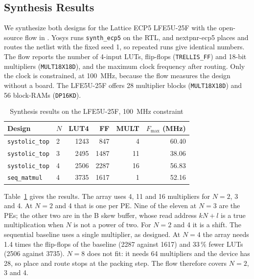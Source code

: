 
\subsection{Synthesis Results}
We synthesize both designs for the Lattice ECP5 LFE5U-25F with the open-source flow in . Yosys runs \texttt{synth\_ecp5} on the RTL, and nextpnr-ecp5 places and routes the netlist with the fixed seed 1, so repeated runs give identical numbers. The flow reports the number of 4-input LUTs, flip-flops (\texttt{TRELLIS\_FF}) and 18-bit multipliers (\texttt{MULT18X18D}), and the maximum clock frequency after routing. Only the clock is constrained, at 100~MHz, because the flow measures the design without a board. The LFE5U-25F offers 28 multiplier blocks (\texttt{MULT18X18D}) and 56 block-RAMs (\texttt{DP16KD}).

\begin{table}[t]
\centering
\caption{Synthesis results on the LFE5U-25F, 100~MHz constraint}
\label{tab:synth}
\footnotesize
\begin{tabular}{@{}llrrrr@{}}
\toprule
Design & $N$ & LUT4 & FF & MULT & $F_{\max}$ (MHz) \\
\midrule
\texttt{systolic\_top} & 2 & 1243 & 847 & 4 & 60.40 \\
\texttt{systolic\_top} & 3 & 2495 & 1487 & 11 & 38.06 \\
\texttt{systolic\_top} & 4 & 2506 & 2287 & 16 & 56.83 \\
\texttt{seq\_matmul} & 4 & 3735 & 1617 & 1 & 52.16 \\
\bottomrule
\end{tabular}
\end{table}

Table~\ref{tab:synth} gives the results. The array uses 4, 11 and 16 multipliers for $N = 2$, 3 and 4. At $N = 2$ and 4 that is one per PE. Nine of the eleven at $N = 3$ are the PEs; the other two are in the B skew buffer, whose read address $kN + l$ is a true multiplication when $N$ is not a power of two. For $N = 2$ and 4 it is a shift. The sequential baseline uses a single multiplier, as designed. At $N = 4$ the array needs 1.4 times the flip-flops of the baseline (2287 against 1617) and 33\,\% fewer LUTs (2506 against 3735). $N = 8$ does not fit: it needs 64 multipliers and the device has 28, so place and route stops at the packing step. The flow therefore covers $N = 2$, 3 and 4.

